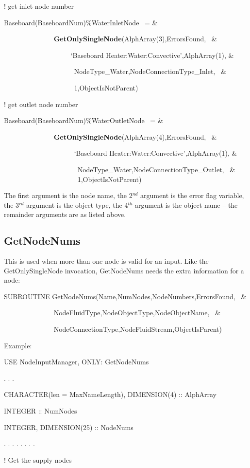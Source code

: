 ! get inlet node number

Baseboard(BaseboardNum)\%WaterInletNode~ = \&

~~~~~~~~~~~~~~ \textbf{GetOnlySingleNode}(AlphArray(3),ErrorsFound,~ \&

~~~~~~~~~~~~~~~~~~~ `Baseboard Heater:Water:Convective',AlphArray(1), \&

~~~~~ ~~~~~~~~~~~~~~~NodeType\_Water,NodeConnectionType\_Inlet,~ \&

~~~~~~~~~~~~~~~~~~~~ 1,ObjectIsNotParent)

! get outlet node number

Baseboard(BaseboardNum)\%WaterOutletNode~ = \&

~~~~~~~~~~~~~~ \textbf{GetOnlySingleNode}(AlphArray(4),ErrorsFound,~ \&

~~~~~~~~~~~~~~~~~~~~ `Baseboard Heater:Water:Convective',AlphArray(1), \&

~~~~~~~~~~~~~~~~~~~~~ NodeType\_Water,NodeConnectionType\_Outlet,~ \& ~~~~~~~~~~~~~~~~~~~~~ 1,ObjectIsNotParent)

The first argument is the node name, the 2\(^{nd}\) argument is the error flag variable, the 3\(^{rd}\) argument is the object type, the 4\(^{th}\) argument is the object name -- the remainder arguments are as listed above.

\subsection{GetNodeNums}\label{getnodenums}

This is used when more than one node is valid for an input. Like the GetOnlySingleNode invocation, GetNodeNums needs the extra information for a node:

SUBROUTINE GetNodeNums(Name,NumNodes,NodeNumbers,ErrorsFound,~ \&

~~~~~~~~~~~~~~ NodeFluidType,NodeObjectType,NodeObjectName,~ \&

~~~~~~~~~~~~~~ NodeConnectionType,NodeFluidStream,ObjectIsParent)

Example:

USE NodeInputManager, ONLY: GetNodeNums

. . .

CHARACTER(len = MaxNameLength), DIMENSION(4) :: AlphArray

INTEGER :: NumNodes

INTEGER, DIMENSION(25) :: NodeNums

. . . . . . . .

! Get the supply nodes

